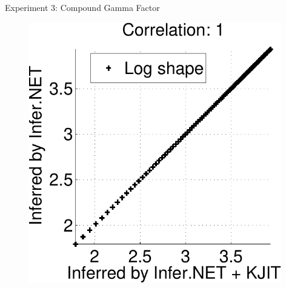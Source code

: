 \documentclass[english]{beamer}
\begin{document}
\begin{frame}
\begin{columns}[t]
\begin{block}{ Experiment 3: Compound Gamma Factor }
\begin{figure}[ht]
{  \includegraphics[width=11cm]{online/cg_post_shape-crop}
  }
  \hspace{1.8cm}
  \hspace{1.8cm}
\end{figure}
\end{block}
\end{columns}
\end{frame}
\end{document}

